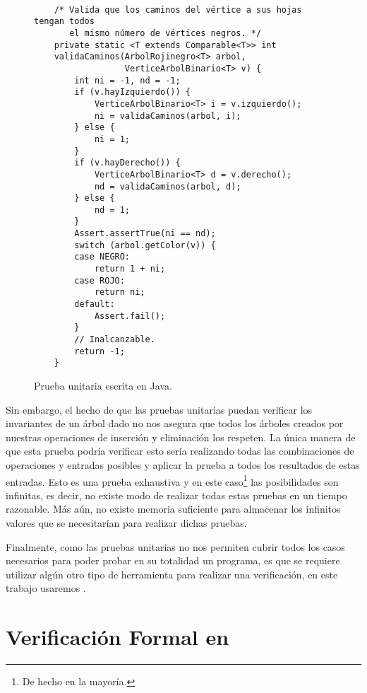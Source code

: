 \begin{figure}[!ht]
\centering
\captionsetup{justification=centering}
\begin{verbatim}

    /* Valida que los caminos del vértice a sus hojas tengan todos
       el mismo número de vértices negros. */
    private static <T extends Comparable<T>> int
    validaCaminos(ArbolRojinegro<T> arbol,
                  VerticeArbolBinario<T> v) {
        int ni = -1, nd = -1;
        if (v.hayIzquierdo()) {
            VerticeArbolBinario<T> i = v.izquierdo();
            ni = validaCaminos(arbol, i);
        } else {
            ni = 1;
        }
        if (v.hayDerecho()) {
            VerticeArbolBinario<T> d = v.derecho();
            nd = validaCaminos(arbol, d);
        } else {
            nd = 1;
        }
        Assert.assertTrue(ni == nd);
        switch (arbol.getColor(v)) {
        case NEGRO:
            return 1 + ni;
        case ROJO:
            return ni;
        default:
            Assert.fail();
        }
        // Inalcanzable.
        return -1;
    }

\end{verbatim}
\caption{Prueba unitaria escrita en Java.\cite{CanekPU}}
\label{unitTestjava}
\end{figure}

Sin embargo, el hecho de que las pruebas unitarias puedan verificar los invariantes de un \'arbol
dado no nos asegura que todos los \'arboles creados por nuestras operaciones de inserci\'on y
eliminaci\'on los respeten. La \'unica manera de que esta prueba podr\'ia verificar esto ser\'ia
realizando todas las combinaciones de operaciones y entradas posibles y aplicar la prueba a todos los
resultados de estas entradas. Esto es una prueba exhaustiva y en este caso\footnote{De hecho en la
mayoría.} las posibilidades son infinitas, es decir, no existe modo de realizar todas estas pruebas
en un tiempo razonable. M\'as a\'un, no existe memoria suficiente para almacenar los infinitos valores que se necesitar\'ian para realizar dichas pruebas. 

Finalmente, como las pruebas unitarias no nos permiten cubrir todos los casos necesarios para poder probar en su totalidad un programa, es que se requiere utilizar algún otro tipo de herramienta para realizar una verificaci\'on, en este trabajo usaremos {\coq}.


\section{Verificaci\'on Formal en {\coq}}

